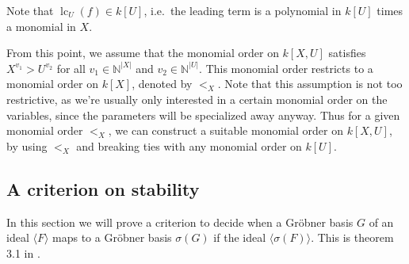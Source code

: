 \documentclass[a4paper, 12pt]{article}
\newcommand{\N}{\mathbb{N}}
\DeclareMathOperator{\LC}{lc}
\theoremstyle{changedot}
\theoremstyle{changedotbreak}
\theoremstyle{nonumberplain}
\begin{document}
Note that $\LC_{U}(f) \in k[U]$, i.e.\ the leading term is a polynomial in $k[U]$ times a monomial in $X$.

From this point, we assume that the monomial order on $k[X, U]$ satisfies $X^{v_{1}} > U^{v_{2}}$ for all $v_{1} \in \N^{|X|}$ and $v_{2} \in \N^{|U|}$. This monomial order restricts to a monomial order on $k[X]$, denoted by $<_{X}$. Note that this assumption is not too restrictive, as we're usually only interested in a certain monomial order on the variables, since the parameters will be specialized away anyway. Thus for a given monomial order $<_{X}$, we can construct a suitable monomial order on $k[X, U]$, by using $<_{X}$ and breaking ties with any monomial order on $k[U]$.

\subsection{A criterion on stability}
In this section we will prove a criterion to decide when a Gröbner basis $G$ of an ideal $\langle F \rangle$ maps to a Gröbner basis $\sigma(G)$ if the ideal $\langle \sigma(F) \rangle$. This is theorem 3.1 in \cite{Kalkbrener}.
\end{document}
